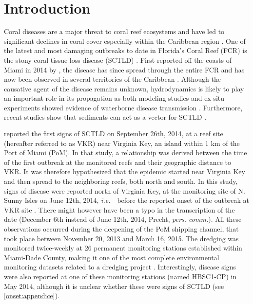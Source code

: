 \documentclass[preprint,12pt,authoryear]{elsarticle}
\newcommand{\ie}{{\it i.e.}\ }
\begin{document}
\linenumbers

\section{Introduction}

Coral diseases are a major threat to coral reef ecosystems and have led to significant declines in coral cover especially within the Caribbean region \citep{richardson1998coral, sutherland2004disease, aronson2001white, harvell2007coral, brandt2009dynamics}. One of the latest and most damaging outbreaks to date in Florida's Coral Reef (FCR) is the stony coral tissue loss disease (SCTLD) \citep{noaa2018}. First reported off the coasts of Miami in 2014 by \cite{precht2016unprecedented}, the disease has since spread through the entire FCR \citep{muller2020spatial,dobbelaere2022connecting} and has now been observed in several territories of the Caribbean \citep{kramer2019map, meiling2021variable, estrada2021effects,heres2021ecological}. Although the causative agent of the disease remains unknown, hydrodynamics is likely to play an important role in its propagation as both modeling studies and ex situ experiments showed evidence of waterborne disease transmission \citep{aeby2019pathogenesis,dobbelaere2020coupled,eaton2021measuring, meiling2021variable}. Furthermore, recent studies show that sediments can act as  a vector for SCTLD \citep{rosales2020rhodobacterales, studivan2022reef}.

\cite{precht2016unprecedented} reported the first signs of SCTLD on September 26th, 2014, at a reef site (hereafter referred to as VKR) near Virginia Key, an island within 1 km of the Port of Miami (PoM). In that study, a relationship was derived between the time of the first outbreak at the monitored reefs and their geographic distance to VKR. It was therefore hypothesized that the epidemic started near Virginia Key and then spread to the neighboring reefs, both north and south. In this study, signs of disease were reported north of Virginia Key, at the monitoring site of N. Sunny Isles on June 12th, 2014, \ie~before the reported onset of the outbreak at VKR site \citep{precht2016unprecedented}. There might however have been a typo in the transcription of the date (December 6th instead of June 12th, 2014, Precht, \textit{pers. comm.}). All these observations occurred during the deepening of the PoM shipping channel, that took place between November 20, 2013 and March 16, 2015. The dredging was monitored twice-weekly at 26 permanent monitoring stations established within Miami-Dade County, making it one of the most complete environmental monitoring datasets related to a dredging project \citep{gintert2019regional}. Interestingly, disease signs were also reported at one of these monitoring stations (named HBSC1-CP) in May 2014, although it is unclear whether these were signs of SCTLD (see \ref{onset:appendice}).
\end{document}
